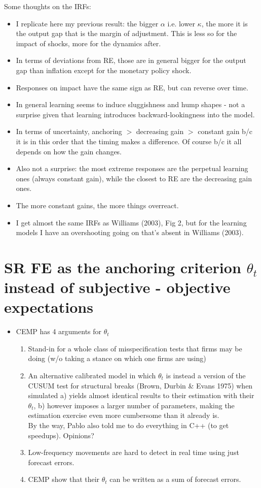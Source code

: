 \documentclass[11pt]{article}
\renewcommand{\[}{\begin{equation}}
\renewcommand{\]}{\end{equation}}
\begin{document}
Some thoughts on the IRFs:
\begin{itemize}
\item I replicate here my previous result: the bigger $\alpha$ i.e. lower $\kappa$, the more it is the output gap that is the margin of adjustment. This is less so for the impact of shocks, more for the dynamics after. 
\item In terms of deviations from RE, those are in general bigger for the output gap than inflation except for the monetary policy shock.
\item Responses on impact have the same sign as RE, but can reverse over time. 
\item In general learning seems to induce sluggishness and hump shapes - not a surprise given that learning introduces backward-lookingness into the model.
\item In terms of uncertainty, anchoring $>$ decreasing gain $>$ constant gain b/c it is in this order that the timing makes a difference. Of course b/c it all depends on how the gain changes.
\item Also not a surprise: the most extreme responses are the perpetual learning ones (always constant gain), while the closest to RE are the decreasing gain ones. 
\item The more constant gains, the more things overreact.
\item I get almost the same IRFs as Williams (2003), Fig 2, but for the learning models I have an overshooting going on that's absent in Williams (2003).
\end{itemize}

\section{SR FE as the anchoring criterion $\theta_t$ instead of subjective - objective expectations}
	\begin{itemize}
	\item  CEMP has 4 arguments for $\theta_t$ 
		\begin{enumerate}
		\item Stand-in for a whole class of misspecification tests that firms may be doing (w/o taking a stance on which one firms are using)
		\item An alternative calibrated model in which $\theta_t$ is instead a version of the CUSUM test for structural breaks (Brown, Durbin \& Evans 1975) when simulated a) yields almost identical results to their estimation with their $\theta_t$, b) however imposes a larger number of parameters, making the estimation exercise even more cumbersome than it already is. \\
		By the way, Pablo also told me to do everything in C++ (to get speedups). Opinions?
		\item Low-frequency movements are hard to detect in real time using just forecast errors.
		\item CEMP show that their $\theta_t$ can be written as a sum of forecast errors.
		\end{enumerate}
	\end{itemize}
\end{document}
